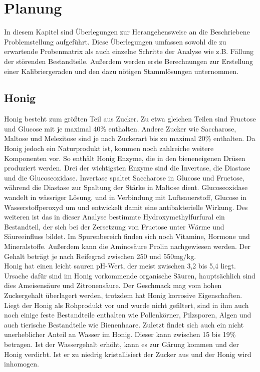 \chapter{Planung}

\label{chap:Planung}
In diesem Kapitel sind Überlegungen zur Herangehensweise an die Beschriebene Problemstellung aufgeführt. Diese Überlegungen umfassen sowohl die zu erwartende Probenmatrix als auch einzelne Schritte der Analyse wie z.B. Fällung der störenden Bestandteile. Außerdem werden erste Berechnungen zur Erstellung einer Kalibriergeraden und den dazu nötigen Stammlösungen unternommen.

\section{Honig}
Honig besteht zum größten Teil aus Zucker. Zu etwa gleichen Teilen sind Fructose und Glucose mit je maximal 40\% enthalten. Andere Zucker wie Saccharose, Maltose und Melezitose sind je nach Zuckerart bis zu maximal 20\% enthalten. Da Honig jedoch ein Naturprodukt ist, kommen noch zahlreiche weitere Komponenten vor. So enthält Honig Enzyme, die in den bieneneigenen Drüsen produziert werden. Drei der wichtigsten Enzyme sind die Invertase, die Diastase und die Glucoseoxidase. Invertase spaltet Saccharose in Glucose und Fructose, während die Diastase zur Spaltung der Stärke in Maltose dient. Glucoseoxidase wandelt in wässriger Lösung, und in Verbindung mit Luftsauerstoff, Glucose in Wasserstoffperoxyd um und entwickelt damit eine antibakterielle Wirkung. Des weiteren ist das in dieser Analyse bestimmte Hydroxymethylfurfural ein Bestandteil, der sich bei der Zersetzung von Fructose unter Wärme und Säureeinfluss bildet. Im Spurenbereich finden sich noch Vitamine, Hormone und Mineralstoffe. Außerdem kann die Aminosäure Prolin nachgewiesen werden. Der Gehalt beträgt je nach Reifegrad zwischen 250 und 550mg/kg.\\
Honig hat einen leicht sauren pH-Wert, der meist zwischen 3,2 bis 5,4 liegt. Ursache dafür sind im Honig vorkommende organische Säuren, hauptsächlich sind dies Ameisensäure und Zitronensäure. Der Geschmack mag vom hohen Zuckergehalt überlagert werden, trotzdem hat Honig korrosive Eigenschaften.\\
Liegt der Honig als Rohprodukt vor und wurde nicht gefiltert, sind in ihm auch noch einige feste Bestandteile enthalten wie Pollenkörner, Pilzsporen, Algen und auch tierische Bestandteile wie Bienenhaare. Zuletzt findet sich auch ein nicht unerheblicher Anteil an Wasser im Honig. Dieser kann zwischen 15 bis 19\% betragen. Ist der Wassergehalt erhöht, kann es zur Gärung kommen und der Honig verdirbt. Ist er zu niedrig kristallisiert der Zucker aus und der Honig wird inhomogen.\\
